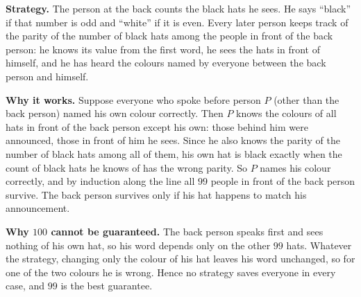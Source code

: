 \textbf{Strategy.} The person at the back counts the black hats he sees. He says ``black'' if that number is odd and ``white'' if it is even. Every later person keeps track of the parity of the number of black hats among the people in front of the back person: he knows its value from the first word, he sees the hats in front of himself, and he has heard the colours named by everyone between the back person and himself.

\textbf{Why it works.} Suppose everyone who spoke before person $P$ (other than the back person) named his own colour correctly. Then $P$ knows the colours of all hats in front of the back person except his own: those behind him were announced, those in front of him he sees. Since he also knows the parity of the number of black hats among all of them, his own hat is black exactly when the count of black hats he knows of has the wrong parity. So $P$ names his colour correctly, and by induction along the line all $99$ people in front of the back person survive. The back person survives only if his hat happens to match his announcement.

\textbf{Why $100$ cannot be guaranteed.} The back person speaks first and sees nothing of his own hat, so his word depends only on the other $99$ hats. Whatever the strategy, changing only the colour of his hat leaves his word unchanged, so for one of the two colours he is wrong. Hence no strategy saves everyone in every case, and $\boxed{99}$ is the best guarantee.

